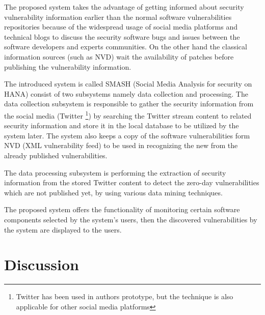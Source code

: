 \documentclass{llncs}
\begin{document}
The proposed system takes the advantage of getting informed about security vulnerability information earlier than the normal software vulnerabilities repositories because of the widespread usage of social media platforms and technical blogs to discuss the security software bugs and issues between the software developers and experts communities. On the other hand the classical information sources (such as NVD) wait the availability of patches before publishing the vulnerability information.

\par The introduced system is called SMASH (Social Media Analysis for security on HANA) consist of two subsystems namely data collection and processing. The data collection subsystem is responsible to gather the security information from the social media (Twitter \footnote{Twitter has been used in authors prototype, but the technique is also applicable for other social media platforms}) by searching the Twitter stream content to related security information and store it in the local database to be utilized by the system later. The system also keeps a copy of the software vulnerabilities form NVD (XML vulnerability feed) to be used in recognizing the new from the already published vulnerabilities.
\par
The data processing subsystem is performing the extraction of security information from the stored Twitter content to detect the zero-day vulnerabilities which are not published yet, by using various data mining techniques.

The proposed system offers the functionality of monitoring certain software components selected by the system's users, then the discovered vulnerabilities  by the system are displayed to the users.
  

\newpage
\section{Discussion}
\end{document}
